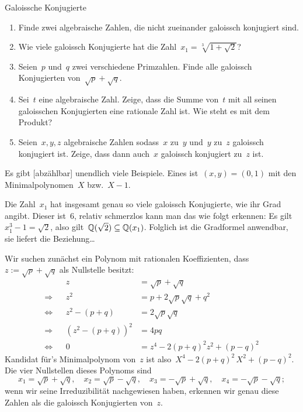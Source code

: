 \documentclass{algblatt}
\begin{document}
\begin{aufgabe}{Galoissche Konjugierte}
\begin{enumerate}
\item Finde zwei algebraische Zahlen, die nicht zueinander galoissch konjugiert
sind.
\item Wie viele galoissch Konjugierte hat die Zahl~$x_1 = \sqrt[3]{1 +
\sqrt{2}}$?
\item Seien~$p$ und~$q$ zwei verschiedene Primzahlen. Finde alle galoissch
Konjugierten von~$\sqrt{p} + \sqrt{q}$.
\item Sei~$t$ eine algebraische Zahl. Zeige, dass die Summe von~$t$ mit all
seinen galoisschen Konjugierten eine rationale Zahl ist. Wie steht es mit dem
Produkt?
\item Seien~$x, y, z$ algebraische Zahlen sodass~$x$ zu~$y$ und~$y$ zu~$z$
galoissch konjugiert ist. Zeige, dass dann auch~$x$ galoissch konjugiert zu~$z$
ist.
\end{enumerate}

\begin{loesungE}
\item Es gibt [abzählbar] unendlich viele Beispiele. Eines ist~$(x,y) = (0,1)$
mit den Minimalpolynomen~$X$ bzw.~$X-1$.

\item Die Zahl~$x_1$ hat insgesamt genau so viele galoissch Konjugierte, wie
ihr Grad angibt. Dieser ist~$6$, relativ schmerzlos kann man das wie folgt
erkennen: Es gilt~$x_1^3 - 1 = \sqrt{2}$, also gilt~$\mathbb{Q}(\sqrt{2}) \subseteq
\mathbb{Q}(x_1)$. Folglich ist die Gradformel anwendbar, sie liefert die
Beziehung\ldots

\item Wir suchen zunächst ein Polynom mit rationalen Koeffizienten, dass~$z :=
\sqrt{p} + \sqrt{q}$ als Nullstelle besitzt:
\begin{align*}
  && z &= \sqrt{p} + \sqrt{q} \\
  \Longrightarrow && z^2 &= p + 2\sqrt{p}\sqrt{q} + q^2 \\
  \Longleftrightarrow && z^2 - (p+q) &= 2\sqrt{p}\sqrt{q} \\
  \Longrightarrow && \left(z^2 - (p+q)\right)^2 &= 4pq \\
  \Longleftrightarrow && 0 &= z^4 - 2(p+q)^2z^2 + (p-q)^2
\end{align*}
Kandidat für's Minimalpolynom von~$z$ ist also~$X^4 - 2(p+q)^2\,X^2 + (p-q)^2$.
Die vier Nullstellen dieses Polynoms sind
\[
  x_1 = \sqrt{p} + \sqrt{q},\quad
  x_2 = \sqrt{p} - \sqrt{q},\quad
  x_3 = -\sqrt{p} + \sqrt{q},\quad
  x_4 = -\sqrt{p} - \sqrt{q};
\]
wenn wir seine Irreduzibilität nachgewiesen haben, erkennen wir genau diese
Zahlen als die galoissch Konjugierten von~$z$.


\end{loesungE}
\end{aufgabe}
\end{document}
